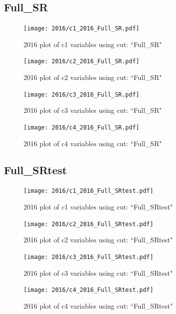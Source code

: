 \documentclass{article}
\begin{document}
      \subsection*{Full\_SR}
                        \begin{figure}[H]
                            \centering
                            \caption{2016 plot of c1 variables using cut: ``Full\_SR"}
                            \texttt{[image: 2016/c1\_2016\_Full\_SR.pdf]}
                        \end{figure}    
                        \begin{figure}[H]
                            \centering
                            \caption{2016 plot of c2 variables using cut: ``Full\_SR"}
                            \texttt{[image: 2016/c2\_2016\_Full\_SR.pdf]}
                        \end{figure}    
                        \begin{figure}[H]
                            \centering
                            \caption{2016 plot of c3 variables using cut: ``Full\_SR"}
                            \texttt{[image: 2016/c3\_2016\_Full\_SR.pdf]}
                        \end{figure}    
                        \begin{figure}[H]
                            \centering
                            \caption{2016 plot of c4 variables using cut: ``Full\_SR"}
                            \texttt{[image: 2016/c4\_2016\_Full\_SR.pdf]}
                        \end{figure}    
      \subsection*{Full\_SRtest}
                        \begin{figure}[H]
                            \centering
                            \caption{2016 plot of c1 variables using cut: ``Full\_SRtest"}
                            \texttt{[image: 2016/c1\_2016\_Full\_SRtest.pdf]}
                        \end{figure}    
                        \begin{figure}[H]
                            \centering
                            \caption{2016 plot of c2 variables using cut: ``Full\_SRtest"}
                            \texttt{[image: 2016/c2\_2016\_Full\_SRtest.pdf]}
                        \end{figure}    
                        \begin{figure}[H]
                            \centering
                            \caption{2016 plot of c3 variables using cut: ``Full\_SRtest"}
                            \texttt{[image: 2016/c3\_2016\_Full\_SRtest.pdf]}
                        \end{figure}    
                        \begin{figure}[H]
                            \centering
                            \caption{2016 plot of c4 variables using cut: ``Full\_SRtest"}
                            \texttt{[image: 2016/c4\_2016\_Full\_SRtest.pdf]}
                        \end{figure}    
\end{document}
